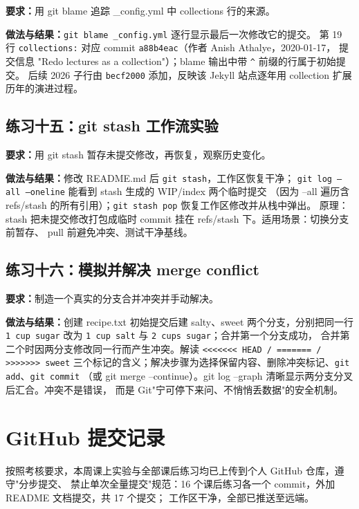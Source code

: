 \documentclass[UTF8]{ctexart}
\begin{document}
\noindent\textbf{要求：}用 git blame 追踪 \_config.yml 中 collections 行的来源。

\noindent\textbf{做法与结果：}\texttt{git blame \_config.yml} 逐行显示最后一次修改它的提交。
第 19 行 \texttt{collections:} 对应 commit \texttt{a88b4eac}（作者 Anish Athalye，2020-01-17，
提交信息 "Redo lectures as a collection"）；blame 输出中带 \texttt{\^} 前缀的行属于初始提交。
后续 2026 子行由 \texttt{becf2000} 添加，反映该 Jekyll 站点逐年用 collection 扩展历年的演进过程。

\subsection{练习十五：git stash 工作流实验}

\noindent\textbf{要求：}用 git stash 暂存未提交修改，再恢复，观察历史变化。

\noindent\textbf{做法与结果：}修改 README.md 后 \texttt{git stash}，工作区恢复干净；
\texttt{git log --all --oneline} 能看到 stash 生成的 WIP/index 两个临时提交
（因为 --all 遍历含 refs/stash 的所有引用）；\texttt{git stash pop} 恢复工作区修改并从栈中弹出。
原理：stash 把未提交修改打包成临时 commit 挂在 refs/stash 下。适用场景：切换分支前暂存、
pull 前避免冲突、测试干净基线。

\subsection{练习十六：模拟并解决 merge conflict}

\noindent\textbf{要求：}制造一个真实的分支合并冲突并手动解决。

\noindent\textbf{做法与结果：}创建 recipe.txt 初始提交后建 salty、sweet 两个分支，分别把同一行
\texttt{1 cup sugar} 改为 \texttt{1 cup salt} 与 \texttt{2 cups sugar}；合并第一个分支成功，
合并第二个时因两分支修改同一行而产生冲突。解读 \texttt{<<<<<<< HEAD / ======= / >>>>>>> sweet}
三个标记的含义；解决步骤为选择保留内容、删除冲突标记、\texttt{git add}、\texttt{git commit}
（或 git merge --continue）。git log --graph 清晰显示两分支分叉后汇合。冲突不是错误，
而是 Git"宁可停下来问、不悄悄丢数据"的安全机制。


\section{GitHub 提交记录}

按照考核要求，本周课上实验与全部课后练习均已上传到个人 GitHub 仓库，遵守"分步提交、
禁止单次全量提交"规范：16 个课后练习各一个 commit，外加 README 文档提交，共 17 个提交；
工作区干净，全部已推送至远端。
\end{document}
